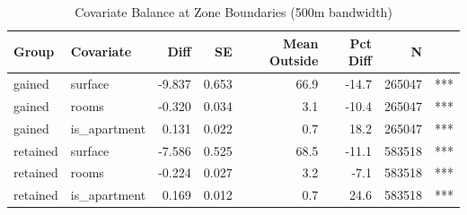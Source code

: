 \begin{table}

\caption{\label{tab:balance}Covariate Balance at Zone Boundaries (500m bandwidth)}
\centering
\begin{tabular}[t]{llrrrrrl}
\toprule
Group & Covariate & Diff & SE & Mean Outside & Pct Diff & N & \\
\midrule
gained & surface & -9.837 & 0.653 & 66.9 & -14.7 & 265047 & ***\\
gained & rooms & -0.320 & 0.034 & 3.1 & -10.4 & 265047 & ***\\
gained & is\_apartment & 0.131 & 0.022 & 0.7 & 18.2 & 265047 & ***\\
retained & surface & -7.586 & 0.525 & 68.5 & -11.1 & 583518 & ***\\
retained & rooms & -0.224 & 0.027 & 3.2 & -7.1 & 583518 & ***\\
\addlinespace
retained & is\_apartment & 0.169 & 0.012 & 0.7 & 24.6 & 583518 & ***\\
\bottomrule
\end{tabular}
\end{table}
